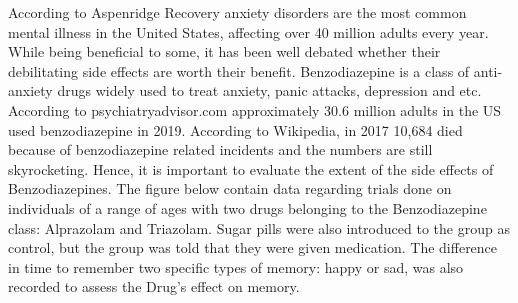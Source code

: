 \documentclass[
]{article}
\begin{document}
According to Aspenridge Recovery anxiety disorders are the most common
mental illness in the United States, affecting over 40 million adults
every year. While being beneficial to some, it has been well debated
whether their debilitating side effects are worth their benefit.
Benzodiazepine is a class of anti-anxiety drugs widely used to treat
anxiety, panic attacks, depression and etc. According to
psychiatryadvisor.com approximately 30.6 million adults in the US used
benzodiazepine in 2019. According to Wikipedia, in 2017 10,684 died
because of benzodiazepine related incidents and the numbers are still
skyrocketing. Hence, it is important to evaluate the extent of the side
effects of Benzodiazepines. The figure below contain data regarding
trials done on individuals of a range of ages with two drugs belonging
to the Benzodiazepine class: Alprazolam and Triazolam. Sugar pills were
also introduced to the group as control, but the group was told that
they were given medication. The difference in time to remember two
specific types of memory: happy or sad, was also recorded to assess the
Drug's effect on memory.
\end{document}
